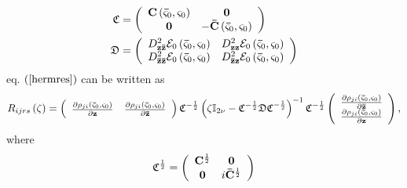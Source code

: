 \documentclass[aps,preprint]{revtex4}%
\begin{document}
\begin{align}
\mathfrak{C}  &  =\left(
\begin{array}
[c]{cc}%
\mathbf{C}\left(  \mathbf{\bar{\varsigma}}_{0},\mathbf{\varsigma}_{0}\right)
& \mathbf{0}\\
\mathbf{0} & -\mathbf{\bar{C}}\left(  \mathbf{\bar{\varsigma}}_{0}%
,\mathbf{\varsigma}_{0}\right)
\end{array}
\right) \nonumber\\
\mathfrak{D}  &  =\left(
\begin{array}
[c]{cc}%
D_{\mathbf{z\bar{z}}}^{2}\mathcal{E}_{0}\left(  \mathbf{\bar{\varsigma}}%
_{0},\mathbf{\varsigma}_{0}\right)  & D_{\mathbf{zz}}^{2}\mathcal{E}%
_{0}\left(  \mathbf{\bar{\varsigma}}_{0},\mathbf{\varsigma}_{0}\right) \\
D_{\mathbf{\bar{z}\bar{z}}}^{2}\mathcal{E}_{0}\left(  \mathbf{\bar{\varsigma}%
}_{0},\mathbf{\varsigma}_{0}\right)  & D_{\mathbf{\bar{z}z}}^{2}%
\mathcal{E}_{0}\left(  \mathbf{\bar{\varsigma}}_{0},\mathbf{\varsigma}%
_{0}\right)
\end{array}
\right)
\end{align}
eq. $\left(  \ref{hermres}\right)  $ can be written as
\begin{equation}
R_{ijrs}\left(  \zeta\right)  =\left(
\begin{array}
[c]{cc}%
\frac{\partial\rho_{ji}\left(  \mathbf{\bar{\varsigma}}_{0},\mathbf{\varsigma
}_{0}\right)  }{\partial\mathbf{z}} & \frac{\partial\rho_{ji}\left(
\mathbf{\bar{\varsigma}}_{0},\mathbf{\varsigma}_{0}\right)  }{\partial
\mathbf{\bar{z}}}%
\end{array}
\right)  \mathfrak{C}^{-\frac{1}{2}}\left(  \zeta\mathbb{I}_{2\nu
}-\mathfrak{C}^{-\frac{1}{2}}\mathfrak{DC}^{-\frac{1}{2}}\right)
^{-1}\mathfrak{C}^{-\frac{1}{2}}\left(
\begin{array}
[c]{c}%
\frac{\partial\rho_{ji}\left(  \mathbf{\bar{\varsigma}}_{0},\mathbf{\varsigma
}_{0}\right)  }{\partial\mathbf{\bar{z}}}\\
\frac{\partial\rho_{ji}\left(  \mathbf{\bar{\varsigma}}_{0},\mathbf{\varsigma
}_{0}\right)  }{\partial\mathbf{z}}%
\end{array}
\right)  , \label{resolv}%
\end{equation}
where
\begin{equation}
\mathfrak{C}^{\frac{1}{2}}=\left(
\begin{array}
[c]{cc}%
\mathbf{C}^{\frac{1}{2}} & \mathbf{0}\\
\mathbf{0} & i\mathbf{\bar{C}}^{\frac{1}{2}}%
\end{array}
\right)
\end{equation}
\end{document}
